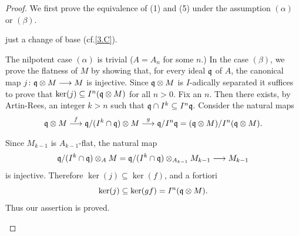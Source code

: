 \documentclass[../main]{subfiles}
\begin{document}
\begin{proof}
We first prove the equivalence of (1) and (5) under the assumption $(\alpha)$ or $(\beta)$. 
\begin{implyenumerate}
    \item[$(1)\implies (5)$] just a change of base (cf.\ref{3.C}).
    \item[$(5)\implies (1)$] The nilpotent case $(\alpha)$ is trivial ($A = A_n$ for some $n$.) In the case $(\beta)$, we prove the flatness of $M$ by showing that, for every ideal $\mathfrak{q}$ of $A$, the canonical map $j\colon \mathfrak{q} \otimes M\longrightarrow M$ is injective. Since $\mathfrak{q} \otimes M$ is $I$-adically separated it suffices to prove that $\ker(j)\subseteq I^n(\mathfrak{q}\otimes M)$ for all $n>0$. Fix an $n$. Then there exists, by Artin-Rees, an integer $k>n$ such that $\mathfrak{q} \cap I^k \subseteq I^n\mathfrak{q}$. Consider the natural maps \[\ideal q \otimes M \varrightarrow{f} \ideal q/(I^k\cap \ideal q)\otimes M\varrightarrow{g} \ideal q/I^n\ideal q = (\ideal q \otimes M)/I^n(\ideal q\otimes M).\]
    Since $M_{k-1}$ is $A_{k-1}$-flat, the natural map \[\mathfrak{q}/(I^k\cap \mathfrak{q})\otimes_A M = \mathfrak{q}/(I^k\cap \mathfrak{q})\otimes_{A_{k-1}} M_{k-1}\longrightarrow M_{k-1}\] 
    is injective. Therefore $\ker(j)\subseteq \ker(f)$, and a fortiori \[\ker(j)\subseteq \ker(gf) = I^n(\mathfrak{q}\otimes M).\] Thus our assertion is proved.
\end{implyenumerate}


\end{proof}
\end{document}

